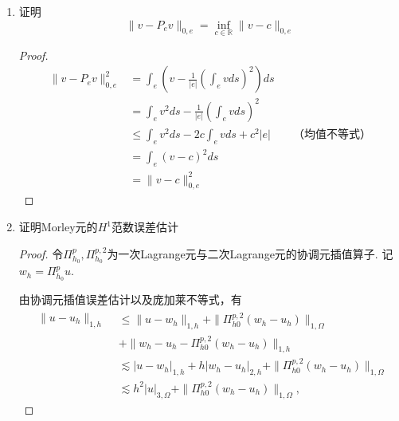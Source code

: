 \documentclass[12pt,a4paper]{article}
\begin{document}
\begin{enumerate}
\begin{proof}
			有
			
			$$\int_0^L - \xi^{\prime\prime} \xi d\xi =\lambda \int_0^L \xi^2 d\xi$$
			分部积分
			$$\int_0^L (\xi^{\prime})^2 d\xi  =\lambda \int_0^L \xi^2 d\xi  $$
			$$\lambda \|\xi\|_{0,e}^2 = |\xi|_{1,e}^2$$
			
			注意到最小特征值$\lambda = \frac{\pi^2}{L^2}$,进而
			
			$$\frac{\pi^2}{L^2} \|\xi\|_{0,e}^2 \leq |\xi|_{1,e}^2$$
			
		\end{proof}
		
		
		
		\item 证明
		$$\|v-P_ev\|_{0,e}=\inf_{c\in\mathbb{R}}\|v-c\|_{0,e}$$
		
		\begin{proof}
			
			$$\begin{aligned}
				\|v-P_e v\|_{0,e}^2 &= \int_e \left(v-\frac{1}{|e|}(\int_e v ds)^2\right)ds\\
				& = \int_e v^2 ds - \frac{1}{|e|}(\int_e v ds)^2\\
				& \leq \int_e v^2 ds - 2c \int_e v ds + c^2 |e| \qquad \text{（均值不等式）}\\
				& = \int_e (v-c)^2 ds\\
				& = \|v-c\|_{0,e}^2
			\end{aligned}$$
			
		\end{proof}
		
		\item 证明Morley元的$H^{1}$范数误差估计
		
		\begin{proof}
			令$\Pi_{h_0}^p,\Pi_{h_0}^{p,2}$为一次Lagrange元与二次Lagrange元的协调元插值算子. 记$w_h = \Pi_{h_0}^p u$.
			
			由协调元插值误差估计以及庞加莱不等式，有
			\begin{equation}\label{eq1}
				\begin{aligned}
					\begin{aligned}\|u-u_h\|_{1,h}\end{aligned}& \leqslant\|u-w_h\|_{1,h}+\|\Pi_{h0}^{p,2}(w_h-u_h)\|_{1,\Omega}  \\
					&+\|w_h-u_h-\Pi_{h0}^{p,2}(w_h-u_h)\|_{1,h} \\
					&\lesssim|u-w_h|_{1,h}+h|w_h-u_h|_{2,h}+\|\Pi_{h0}^{p,2}(w_h-u_h)\|_{1,\Omega} \\
					&\lesssim h^2|u|_{3,\Omega}+\|\Pi_{h0}^{p,2}(w_h-u_h)\|_{1,\Omega},
				\end{aligned}
			\end{equation}
			

\end{proof}
\end{enumerate}
\end{document}
